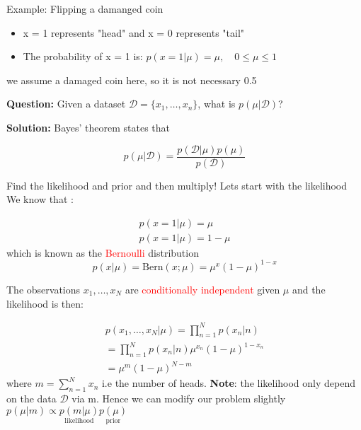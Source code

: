\begin{example}{Example: Flipping a damanged coin}
    \begin{itemize}
        \item x = 1 represents "head" and x = 0 represents "tail"
        \item The probability of x = 1 is:
            $p(x=1 | \mu) = \mu, \quad 0 \le \mu  \le 1$
    \end{itemize}
    we assume a damaged coin here, so it is not necessary 0.5
    
    \vspace{2em}

    \textbf{Question:} Given a dataset $\mathcal{D} = \{ x_1, \dots, x_n\}$, what is $p(\mu|\mathcal{D})$?

    \vspace*{1em}

    \textbf{Solution:} Bayes' theorem states that

        \begin{equation}
            p(\mu|\mathcal{D}) = \frac{p (\mathcal{D}|\mu)p(\mu)} {p(\mathcal{D})} 
        \end{equation}

        Find the likelihood and prior and then multiply! Lets start with the likelihood \\
        We know that :

        \begin{equation}
        \begin{aligned}
            p(x=1|\mu) = \mu \\
            p(x=1|\mu) = 1 - \mu
        \end{aligned}
        \end{equation}
        which is known as the \textcolor{red}{Bernoulli} distribution
        \begin{equation}
            p(x|\mu) = \text{Bern}(x;\mu) = \mu^{x}(1-\mu)^{1-x}
        \end{equation}

        The observations $x_1, \dots, x_N$ are \textcolor{red}{conditionally independent} given $\mu$ and the likelihood is then:

        \begin{equation}
        \begin{aligned}
            p(x_1, \dots, x_N | \mu) = \prod_{n=1}^{N} p(x_n|n) \\
            = \prod_{n=1}^{N} p(x_n|n) \mu^{x_n}(1-\mu)^{1 - x_n} \\
            = \mu^{m} (1-\mu)^{N-m}
        \end{aligned}
        \end{equation}
        where $m = \sum_{n=1}^{N}x_n$ i.e the number of heads. \textbf{Note}: the likelihood only depend on the data $\mathcal{D}$ via m. 
        Hence we can modify our problem slightly $p (\mu|m) \propto \underset{\text{likelihood}}{p (m|\mu)} \underset{\text{prior}}{p(\mu)}$


\end{example}
